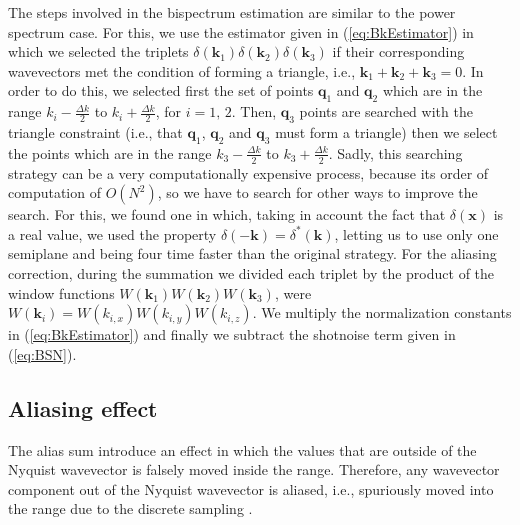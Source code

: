 \documentclass[a4paper,fleqn,usenatbib]{mnras}
\begin{document}
The steps involved in the bispectrum estimation are similar to the power 
spectrum case. For this, we use the estimator given in (\ref{eq:BkEstimator}) in 
which we selected the triplets $\delta(\mathbf{k}_1) \delta(\mathbf{k}_2) 
\delta(\mathbf{k}_3)$ if their corresponding wavevectors met the condition of 
forming a triangle, i.e., $\mathbf{k}_1+\mathbf{k}_2+\mathbf{k}_3=0$. In order 
to do this, we selected first the set of points $\mathbf{q}_1$ and 
$\mathbf{q}_2$ which are in the range $k_i-\frac{\Delta k}{2}$ to 
$k_i+\frac{\Delta k}{2}$, for $i=1,\,2$. Then, $\mathbf{q}_3$ points are 
searched with the triangle constraint (i.e., that $\mathbf{q}_1$, $\mathbf{q}_2$ 
and $\mathbf{q}_3$ must form a triangle) then we select the points which are 
in the range $k_3-\frac{\Delta k}{2}$ to $k_3+\frac{\Delta k}{2}$. Sadly, this 
searching strategy can be a very computationally expensive process, because its 
order of computation of $O(N^2)$, so we have to search for other ways to 
improve the search. For this, we found one in which, taking in account the fact 
that $\delta(\mathbf{x})$ is a real value, we used the property 
$\delta(-\mathbf{k})=\delta^*(\mathbf{k})$, letting us to use only one semiplane 
and being four time faster than the original strategy. For the aliasing 
correction, during the summation we divided each triplet by the product of the 
window functions $W(\mathbf{k}_1)W(\mathbf{k}_2)W(\mathbf{k}_3)$, were 
$W(\mathbf{k}_i)=W(k_{i,x})W(k_{i,y})W(k_{i,z})$. We multiply the normalization 
constants in (\ref{eq:BkEstimator}) and finally we subtract the shotnoise term 
given in (\ref{eq:BSN}).

\subsection{Aliasing effect}

The alias sum introduce an effect in which the values that are outside of the 
Nyquist wavevector is falsely moved inside the range. Therefore, any wavevector 
component out of the Nyquist wavevector is aliased, i.e., spuriously moved into 
the range due to the discrete sampling \citep{Press1992}. 

\end{document}
